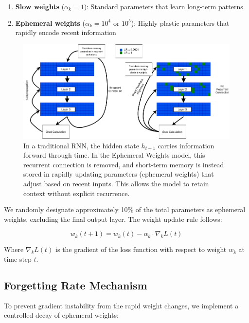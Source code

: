 \documentclass{article} %
\begin{document}
\begin{enumerate}
\item \textbf{Slow weights} ($\alpha_k = 1$): Standard parameters that learn long-term patterns
\item \textbf{Ephemeral weights} ($\alpha_k = 10^4$ or $10^5$): Highly plastic parameters that rapidly encode recent information
\end{enumerate}

\begin{figure}[h]
\begin{center}
\includegraphics[width=0.8\linewidth]{model_diagram.png}
\caption{In a traditional RNN, the hidden state $h_{t-1}$ carries information forward through time. In the Ephemeral Weights model, this recurrent connection is removed, and short-term memory is instead stored in rapidly updating parameters (ephemeral weights) that adjust based on recent inputs. This allows the model to retain context without explicit recurrence.}
\label{fig:model_diagram}
\end{center}
\end{figure}

We randomly designate approximately 10\% of the total parameters as ephemeral weights, excluding the final output layer. The weight update rule follows:

\begin{equation}
w_k(t+1) = w_k(t) - \alpha_k \cdot \nabla_k L(t)
\end{equation}

Where $\nabla_k L(t)$ is the gradient of the loss function with respect to weight $w_k$ at time step $t$.

\subsection{Forgetting Rate Mechanism}

To prevent gradient instability from the rapid weight changes, we implement a controlled decay of ephemeral weights:
\end{document}
